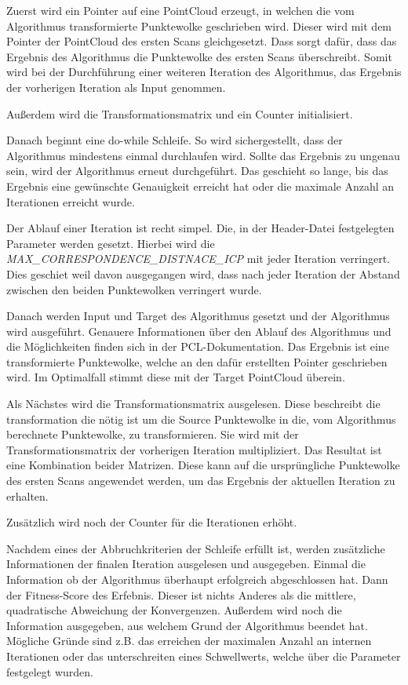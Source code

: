 Zuerst wird ein Pointer auf eine PointCloud erzeugt, in welchen die vom Algorithmus transformierte Punktewolke geschrieben wird.
Dieser wird mit dem Pointer der PointCloud des ersten Scans gleichgesetzt.
Dass sorgt dafür, dass das Ergebnis des Algorithmus die Punktewolke des ersten Scans überschreibt.
Somit wird bei der Durchführung einer weiteren Iteration des Algorithmus, das Ergebnis der vorherigen Iteration als Input genommen.

Außerdem wird die Transformationsmatrix und ein Counter initialisiert.

Danach beginnt eine do-while Schleife.
So wird sichergestellt, dass der Algorithmus mindestens einmal durchlaufen wird.
Sollte das Ergebnis zu ungenau sein, wird der Algorithmus erneut durchgeführt.
Das geschieht so lange, bis das Ergebnis eine gewünschte Genauigkeit erreicht hat 
oder die maximale Anzahl an Iterationen erreicht wurde.

Der Ablauf einer Iteration ist recht simpel.
Die, in der Header-Datei festgelegten Parameter werden gesetzt.
Hierbei wird die \textit{MAX\_CORRESPONDENCE\_DISTNACE\_ICP} mit jeder Iteration verringert.
Dies geschiet weil davon ausgegangen wird, dass nach jeder Iteration der Abstand zwischen den beiden Punktewolken verringert wurde.

Danach werden Input und Target des Algorithmus gesetzt und der Algorithmus wird ausgeführt.
Genauere Informationen über den Ablauf des Algorithmus und die Möglichkeiten finden sich in der PCL-Dokumentation. \cite{pcl2024icp}
Das Ergebnis ist eine transformierte Punktewolke, welche an den dafür erstellten Pointer geschrieben wird.
Im Optimalfall stimmt diese mit der Target PointCloud überein.

Als Nächstes wird die Transformationsmatrix ausgelesen.
Diese beschreibt die transformation die nötig ist um die Source Punktewolke in die, 
vom Algorithmus berechnete Punktewolke, zu transformieren.
Sie wird mit der Transformationsmatrix der vorherigen Iteration multipliziert.
Das Resultat ist eine Kombination beider Matrizen.
Diese kann auf die ursprüngliche Punktewolke des ersten Scans angewendet werden, 
um das Ergebnis der aktuellen Iteration zu erhalten.

Zusätzlich wird noch der Counter für die Iterationen erhöht.
\newline

Nachdem eines der Abbruchkriterien der Schleife erfüllt ist, werden zusätzliche Informationen der finalen Iteration ausgelesen und ausgegeben.
Einmal die Information ob der Algorithmus überhaupt erfolgreich abgeschlossen hat.
Dann der Fitness-Score des Erfebnis. 
Dieser ist nichts Anderes als die mittlere, quadratische Abweichung der Konvergenzen.
Außerdem wird noch die Information ausgegeben, aus welchem Grund der Algorithmus beendet hat.
Mögliche Gründe sind z.B. das erreichen der maximalen Anzahl an internen Iterationen
oder das unterschreiten eines Schwellwerts, welche über die Parameter festgelegt wurden.

